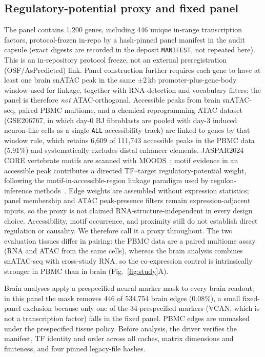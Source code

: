 \documentclass[fleqn,10pt,lineno]{wlpeerj}
\begin{document}
\subsection{Regulatory-potential proxy and fixed panel}\label{sec:proxy}
The panel contains 1,200 genes, including 446 unique in-range transcription factors,
protocol-frozen in-repo by a hash-pinned panel manifest in the audit capsule
(exact digests are recorded in the deposit \texttt{MANIFEST}, not repeated here).
This is an in-repository protocol freeze, not an external preregistration
(OSF/AsPredicted) link. Panel construction further requires each gene to have at least one brain
snATAC peak in the same $\pm2$\,kb promoter-plus-gene-body window used for linkage, together with
RNA-detection and vocabulary filters; the panel is therefore \emph{not} ATAC-orthogonal. Accessible
peaks from brain snATAC-seq, paired PBMC multiome, and a chemical reprogramming ATAC dataset
(GSE206767, in which day-0 BJ fibroblasts are pooled with day-3 induced neuron-like cells as a
single \texttt{ALL} accessibility track) are linked to genes by that window rule, which retains
6{,}609 of 111{,}743 accessible peaks in the PBMC data (5.91\%) and systematically excludes distal
enhancer elements. JASPAR2024 CORE vertebrate motifs are scanned with
MOODS~\citep{rauluseviciute2024jaspar,korhonen2009moods}; motif evidence in an accessible peak
contributes a directed TF--target regulatory-potential weight, following the
motif-in-accessible-region linkage paradigm used by regulon-inference methods~\citep{aibar2017scenic}. Edge
weights are assembled without expression statistics; panel membership and ATAC peak-presence
filters remain expression-adjacent inputs, so the proxy is not claimed RNA-structure-independent in
every design choice. Accessibility, motif occurrence, and proximity still do not establish direct
regulation or causality. We therefore call it a proxy throughout. The two evaluation tissues differ
in pairing: the PBMC data are a paired multiome assay (RNA and ATAC from the same cells), whereas
the brain analysis combines snATAC-seq with cross-study RNA, so the co-expression control is
intrinsically stronger in PBMC than in brain (Fig.~\ref{fig:study}A).

Brain analyses apply a prespecified neural marker mask to every brain readout; in this panel the
mask removes 446 of 534{,}754 brain edges (0.08\%), a small fixed-panel exclusion because only one
of the 34 prespecified markers (VCAN, which is not a transcription factor) falls in the fixed panel. PBMC edges are unmasked under
the prespecified tissue policy. Before
analysis, the driver verifies the manifest, TF identity and order across all caches, matrix dimensions
and finiteness, and four pinned legacy-file hashes.
\end{document}
